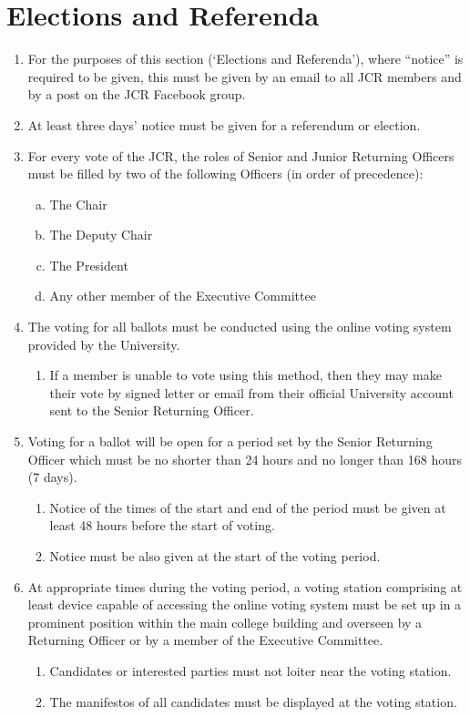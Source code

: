 \documentclass[12pt]{article}  %
\begin{document}
\section{Elections and Referenda}
\begin{enumerate}
    \item For the purposes of this section (‘Elections and Referenda’), where “notice” is required to be given, this must be given by an email to all JCR members and by a post on the JCR Facebook group.
    \item At least three days’ notice must be given for a referendum or election.
    \item For every vote of the JCR, the roles of Senior and Junior Returning Officers must be filled by two of the following Officers (in order of precedence):
    \begin{enumerate}[(a)]
        \item The Chair
        \item The Deputy Chair
        \item The President
        \item Any other member of the Executive Committee
    \end{enumerate}
    \item The voting for all ballots must be conducted using the online voting system provided by the University.
    \begin{enumerate}
        \item If a member is unable to vote using this method, then they may make their vote by signed letter or email from their official University account sent to the Senior Returning Officer. 
    \end{enumerate}
    \item Voting for a ballot will be open for a period set by the Senior Returning Officer which must be no shorter than 24 hours and no longer than 168 hours (7 days).
    \begin{enumerate}
        \item Notice of the times of the start and end of the period must be given at least 48 hours before the start of voting.
        \item Notice must be also given at the start of the voting period.
    \end{enumerate}
    \item At appropriate times during the voting period, a voting station comprising at least device capable of accessing the online voting system must be set up in a prominent position within the main college building and overseen by a Returning Officer or by a member of the Executive Committee.
    \begin{enumerate}
        \item Candidates or interested parties must not loiter near the voting station.
        \item The manifestos of all candidates must be displayed at the voting station.
    \end{enumerate}

\end{enumerate}
\end{document}
